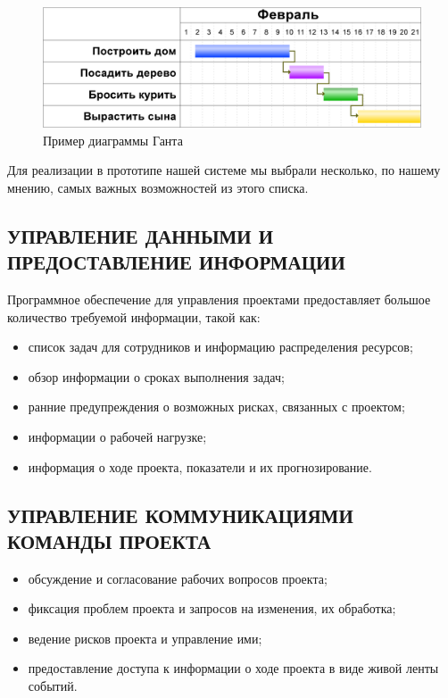 \documentclass[14pt, a4paper]{extreport}
\begin{document}
\begin{figure}[!htb]
  \centering
    \includegraphics[scale=0.25]{pics/gantt.png}
    \caption{Пример диаграммы Ганта}
    \label{fig:gantt_ex}
\end{figure}

Для реализации в прототипе нашей системе мы выбрали несколько, по нашему мнению, самых важных возможностей
из этого списка.

\subsection{\MakeTextUppercase{Управление данными и предоставление информации}}
Программное обеспечение для управления проектами предоставляет большое количество
требуемой информации, такой как:
\begin{itemize}
  \item список задач для сотрудников и информацию распределения ресурсов;
  \item обзор информации о сроках выполнения задач;
  \item ранние предупреждения о возможных рисках, связанных с проектом;
  \item информации о рабочей нагрузке;
  \item информация о ходе проекта, показатели и их прогнозирование.
\end{itemize}

\subsection{\MakeTextUppercase{Управление коммуникациями команды проекта}}
\begin{itemize}
  \item обсуждение и согласование рабочих вопросов проекта;
  \item фиксация проблем проекта и запросов на изменения, их обработка;
  \item ведение рисков проекта и управление ими;
  \item предоставление доступа к информации о ходе проекта в виде живой ленты событий.
\end{itemize}
\end{document}
